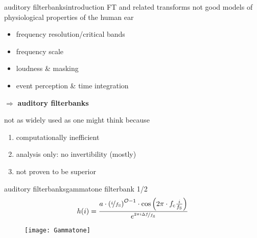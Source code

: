         \begin{frame}{auditory filterbanks}{introduction}
            FT and related transforms not good models of physiological properties of the human ear
                \begin{itemize}
                    \item   frequency resolution/critical bands
                    \item   frequency scale
                    \item   loudness \& masking
                    \item   event perception \&  time integration
                \end{itemize}
            
            $\Rightarrow$ \textbf{auditory filterbanks}
            
            \pause
            \bigskip
            not as widely used as one might think because
            
            \begin{enumerate}
                \item<3->	computationally inefficient
                \item<4->	analysis only: no invertibility (mostly)
                \item<5->	not proven to be superior
            \end{enumerate}
        \end{frame}	

        \begin{frame}{auditory filterbanks}{gammatone filterbank 1/2}
            \vspace{-3mm}
            \begin{equation*}
                h(i) = \frac{ a \cdot\left(\nicefrac{i}{f_{\mathrm{S}}}\right)^{\mathcal{O}-1}\cdot \cos\left( 2\pi \cdot f_{\mathrm{c}} \frac{ i}{f_{\mathrm{S}}} \right) }{{e}^{\nicefrac{2\pi i \Delta f}{f_{\mathrm{S}}}}}
            \end{equation*}
            \vspace{-3mm}
            \begin{figure}
                \texttt{[image: Gammatone]}
                \label{fig:gammatone}
            \end{figure}
        \end{frame}	


